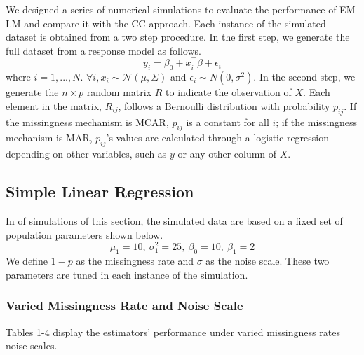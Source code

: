 \documentclass[
  twocolumn]{article}
\begin{document}
We designed a series of numerical simulations to evaluate the
performance of EM-LM and compare it with the CC approach. Each instance
of the simulated dataset is obtained from a two step procedure. In the
first step, we generate the full dataset from a response model as
follows. \[
y_i = \beta_0 + x_{i}^{\top}\beta + \epsilon_i
\] where \(i = 1,...,N\).
\(\forall i, x_i \sim \mathcal{N}(\mu, \Sigma)\) and
\(\epsilon_i \sim N(0, \sigma^2)\). In the second step, we generate the
\(n \times p\) random matrix \(R\) to indicate the observation of \(X\).
Each element in the matrix, \(R_{ij}\), follows a Bernoulli distribution
with probability \(p_{ij}\). If the missingness mechanism is MCAR,
\(p_{ij}\) is a constant for all \(i\); if the missingness mechanism is
MAR, \(p_{ij}\)'s values are calculated through a logistic regression
depending on other variables, such as \(y\) or any other column of
\(X\).

\hypertarget{simple-linear-regression}{%
\subsection{Simple Linear Regression}\label{simple-linear-regression}}

In of simulations of this section, the simulated data are based on a
fixed set of population parameters shown below. \[
\mu_1 = 10,~\sigma_{1}^{2} = 25,~\beta_0 = 10,~\beta_1 = 2
\] We define \(1 - p\) as the missingness rate and \(\sigma\) as the
noise scale. These two parameters are tuned in each instance of the
simulation.

\hypertarget{varied-missingness-rate-and-noise-scale}{%
\subsubsection{Varied Missingness Rate and Noise
Scale}\label{varied-missingness-rate-and-noise-scale}}

Tables 1-4 display the estimators' performance under varied missingness
rates noise scales.
\end{document}

